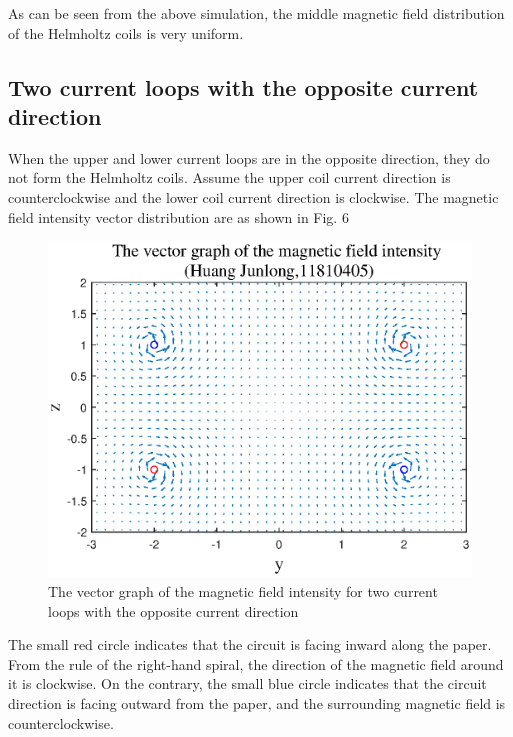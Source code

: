 \documentclass[journal,twocolumn,letterpaper]{IEEEJERM}
\begin{document}
As can be seen from the above simulation, the middle magnetic field distribution of the Helmholtz coils is very uniform.

\subsection{Two current loops with the opposite current direction}
When the upper and lower current loops are in the opposite direction, they do not form the Helmholtz coils. Assume the upper coil current direction is counterclockwise and the lower coil current direction is clockwise. The magnetic field intensity vector distribution are as shown in Fig. 6
\begin{figure}[H]   
	\centering	        \includegraphics[width=0.9\linewidth]{F2-1.eps}
	\caption{The vector graph of the magnetic field intensity for two current loops with the opposite current direction}	  
	\label{fig6} 
\end{figure}
The small red circle indicates that the circuit is facing inward along the paper. From the rule of the right-hand spiral, the direction of the magnetic field around it is clockwise. On the contrary, the small blue circle indicates that the circuit direction is facing outward from the paper, and the surrounding magnetic field is counterclockwise. 
\end{document}
